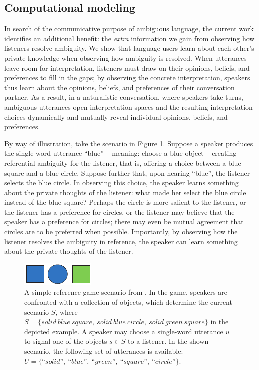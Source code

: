 \documentclass[11pt,a4paper]{article}
\begin{document}
\subsection{Computational modeling}

In search of the communicative purpose of ambiguous language, the current work identifies an additional benefit: the \emph{extra} information we gain from observing how listeners resolve ambiguity.
We show that language users learn about each other's private knowledge when observing how ambiguity is resolved. 
When utterances leave room for interpretation, listeners must draw on their opinions, beliefs, and preferences to fill in the gaps;
by observing the concrete interpretation, speakers thus learn about the opinions, beliefs, and preferences of their conversation partner.
As a result, in a naturalistic conversation, where speakers take turns, ambiguous utterances open interpretation spaces and the resulting interpretation choices dynamically and mutually reveal individual opinions, beliefs, and preferences. 


By way of illustration, take the scenario in Figure \ref{FG-ref-game}.
Suppose a speaker produces the single-word utterance ``blue'' -- meaning: choose a blue object -- creating referential ambiguity for the listener, that is, offering a choice between a blue square and a blue circle. 
Suppose further that, upon hearing ``blue'', the listener selects the blue circle.
In observing this choice, the speaker learns something about the private thoughts of the listener: what made her select the blue circle instead of the blue square? Perhaps the circle is more salient to the listener, or the listener has a preference for circles, or the listener may believe that the speaker has a preference for circles; there may even be mutual agreement that circles are to be preferred when possible. Importantly, by observing how the listener resolves the ambiguity in reference, the speaker can learn something about the private thoughts of the listener.


\begin{figure}
	\centering
	\includegraphics[width=.5\linewidth]{images/rsascene-eps-converted-to.pdf}
	\caption{A simple reference game scenario from \protect{}.
		In the game, speakers are confronted with a collection of objects, which determine the current scenario $S$, where $S=\{solid\ blue\ square,\ solid\ blue\ circle,\ solid\ green\ square\}$ in the depicted example. 
		A speaker may choose a single-word utterance $u$ to signal one of the objects $s\in S$ to a listener.
		In the shown scenario, the following set of utterances is available: $U =\{\textit{``solid''},\ \textit{``blue''},\ \textit{``green''},\ \textit{``square''},\ \textit{``circle''}\}$.
		}
	\label{FG-ref-game}
\end{figure}
\end{document}
